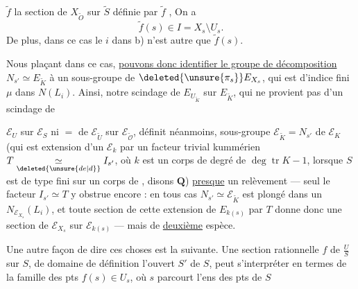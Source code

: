   $\widetilde f$  la section de $X_{\widetilde O}$ sur $\widetilde S$
définie par $\widetilde f$ ,
 On a
\[
\widetilde f(s)\in I=X_s\setminus U_s.
\]
De plus, dans ce cas le $i$ dans b) n'est
autre que $\widetilde f(s)$.

Nous plaçant dans ce cas, \uline{ pouvons donc
identifier le groupe de décomposition} $N_{s'}\simeq E_{\widetilde K}$
à un sous-groupe de $\deleted{\unsure{\pi_s}}E_{X_s}$,  qui est
d'indice fini $\mu$ dans  $N(L_i)$. Ainsi,
notre scindage  de $E_{U_{\widetilde K}}$  sur $E_{\widetilde K}$,
qui ne provient pas d'un scindage de

$\mathcal E_U$ sur $\mathcal E_S$ ni $=$ de $\mathcal E_{\widetilde U}$ sur $\mathcal E_{\widetilde{\mathcal O}}$, définit néanmoins,   sous-groupe $\mathcal E_{\widetilde K}=N_{s'}$ de $\mathcal E_K$ (qui est extension d'un $\mathcal E_k$ par un facteur trivial kummérien $T\underset{\deleted{\unsure{de|d}}}{\simeq}I_{s'}$, où $k$ est un corps de degré de  $\deg\operatorname{tr}K-1$, lorsque $S$ est de type fini sur un corps de , disons $\mathbf Q$) \uline{presque} un relèvement --- seul le facteur $I_{s'}\simeq T$ y obstrue encore : en tous cas $N_{s'}\simeq\mathcal E_{\widetilde K}$ est plongé dans un $N_{\mathcal E_{X_s}}(L_i)$, et toute section de cette extension de $E_{k(s)}$ par $T$ donne donc une section de $\mathcal E_{X_s}$ sur $\mathcal E_{k(s)}$ --- mais de \uline{deuxième} espèce.

Une  autre façon de dire ces choses est la suivante. Une section rationnelle $f$ de $\frac{U}{S}$ sur $S$, de domaine de définition l'ouvert $S'$ de $S$,  peut s'interpréter en termes de la famille des pts $f(s)\in U_s$, où $s$ parcourt l'ens des pts de $S$

